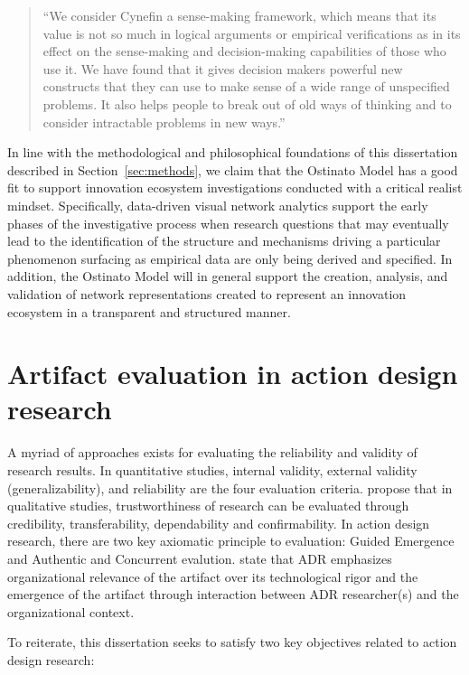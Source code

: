 \begin{quote} ``We consider Cynefin a sense-making framework, which means that its value is not so much in logical arguments or empirical verifications as in its effect on the sense-making and decision-making capabilities of those who use it. We have found that it gives decision makers powerful new constructs that they can use to make sense of a wide range of unspecified problems. It also helps people to break out of old ways of thinking and to consider intractable problems in new ways.'' \citep{Kurtz2003}
\end{quote}

In line with the methodological and philosophical foundations of this dissertation described in Section~\ref{sec:methods}, we claim that the Ostinato  Model has a good fit to support innovation ecosystem investigations conducted with a critical realist mindset. Specifically, data-driven visual network analytics support the early phases of the investigative process when research questions that may eventually lead to the identification of the structure and mechanisms driving a particular phenomenon surfacing as empirical data are only being derived and specified. In addition, the Ostinato Model will in general support the creation, analysis, and validation of network representations created to represent an innovation ecosystem in a transparent and structured manner.

\section{Artifact evaluation in action design research}
\label{sec:evaluation}

A myriad of approaches exists for evaluating the reliability and validity of research results. In quantitative studies, internal validity, external validity (generalizability), and reliability are the four evaluation criteria. \cite{Shenton2004StrategiesProjects} propose that in qualitative studies, trustworthiness of research can be evaluated through credibility, transferability, dependability and confirmability. In action design research, there are two key axiomatic principle to evaluation: Guided Emergence and Authentic and Concurrent evalution. \cite{Sein2011ActionResearch} state that ADR emphasizes organizational relevance of the artifact over its technological rigor and the emergence of the artifact through interaction between ADR researcher(s) and the organizational context.

To reiterate, this dissertation seeks to satisfy two key objectives related to action design research:

